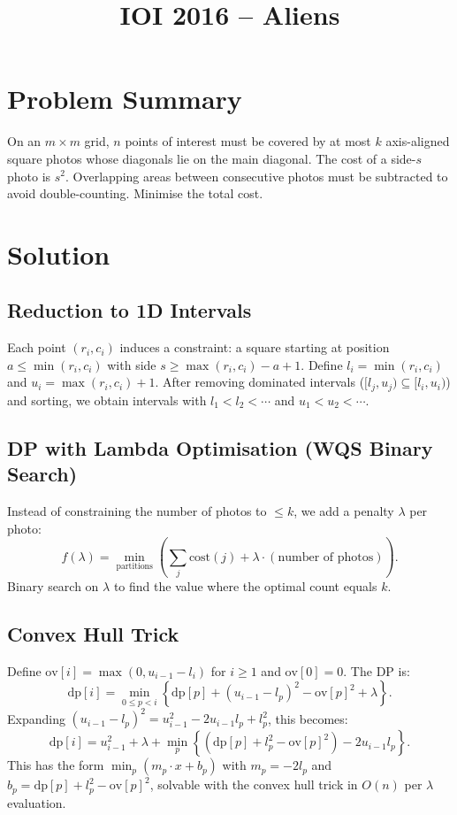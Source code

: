 \documentclass[11pt,a4paper]{article}
\title{IOI 2016 -- Aliens}
\author{}
\date{}
\begin{document}
\maketitle

\section{Problem Summary}

On an $m \times m$ grid, $n$ points of interest must be covered by at most $k$ axis-aligned square photos whose diagonals lie on the main diagonal. The cost of a side-$s$ photo is $s^2$. Overlapping areas between consecutive photos must be subtracted to avoid double-counting. Minimise the total cost.

\section{Solution}

\subsection{Reduction to 1D Intervals}

Each point $(r_i, c_i)$ induces a constraint: a square starting at position $a \le \min(r_i, c_i)$ with side $s \ge \max(r_i, c_i) - a + 1$. Define $l_i = \min(r_i, c_i)$ and $u_i = \max(r_i, c_i) + 1$. After removing dominated intervals ($[l_j, u_j) \subseteq [l_i, u_i)$) and sorting, we obtain intervals with $l_1 < l_2 < \cdots$ and $u_1 < u_2 < \cdots$.

\subsection{DP with Lambda Optimisation (WQS Binary Search)}

Instead of constraining the number of photos to $\le k$, we add a penalty $\lambda$ per photo:
\[
  f(\lambda) = \min_{\text{partitions}} \left(\sum_j \text{cost}(j) + \lambda \cdot (\text{number of photos})\right).
\]
Binary search on $\lambda$ to find the value where the optimal count equals $k$.

\subsection{Convex Hull Trick}

Define $\text{ov}[i] = \max(0, u_{i-1} - l_i)$ for $i \ge 1$ and $\text{ov}[0] = 0$. The DP is:
\[
  \text{dp}[i] = \min_{0 \le p < i} \left\{\text{dp}[p] + (u_{i-1} - l_p)^2 - \text{ov}[p]^2 + \lambda\right\}.
\]
Expanding $(u_{i-1} - l_p)^2 = u_{i-1}^2 - 2 u_{i-1} l_p + l_p^2$, this becomes:
\[
  \text{dp}[i] = u_{i-1}^2 + \lambda + \min_p \left\{(\text{dp}[p] + l_p^2 - \text{ov}[p]^2) - 2 u_{i-1} l_p\right\}.
\]
This has the form $\min_p (m_p \cdot x + b_p)$ with $m_p = -2l_p$ and $b_p = \text{dp}[p] + l_p^2 - \text{ov}[p]^2$, solvable with the convex hull trick in $O(n)$ per $\lambda$ evaluation.
\end{document}
